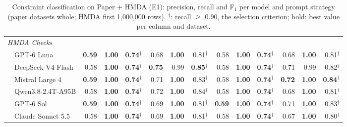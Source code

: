 \begin{table}[t]
\begin{tabular}{l@{\hspace{0.6em}}rrr@{\hspace{0.6em}}rrr@{\hspace{0.6em}}rrr@{\hspace{0.6em}}rrr}
  \midrule
  \multicolumn{13}{l}{\textit{HMDA Checks}} \\
  ~~GPT-6 Luna & \textbf{0.59} & \textbf{1.00} & \textbf{0.74}$^\dagger$ & 0.68 & \textbf{1.00} & 0.81$^\dagger$ & 0.58 & \textbf{1.00} & \textbf{0.74}$^\dagger$ & 0.68 & \textbf{1.00} & 0.81$^\dagger$ \\
  ~~DeepSeek-V4-Flash & 0.58 & \textbf{1.00} & \textbf{0.74}$^\dagger$ & \textbf{0.75} & 0.99 & \textbf{0.85}$^\dagger$ & 0.58 & \textbf{1.00} & \textbf{0.74}$^\dagger$ & 0.71 & 0.99 & 0.82$^\dagger$ \\
  ~~Mistral Large 4 & \textbf{0.59} & \textbf{1.00} & \textbf{0.74}$^\dagger$ & 0.71 & \textbf{1.00} & 0.83$^\dagger$ & 0.58 & \textbf{1.00} & \textbf{0.74}$^\dagger$ & \textbf{0.72} & \textbf{1.00} & \textbf{0.84}$^\dagger$ \\
  ~~Qwen3.8-2.4T-A95B & 0.58 & \textbf{1.00} & \textbf{0.74}$^\dagger$ & 0.72 & \textbf{1.00} & 0.84$^\dagger$ & 0.58 & \textbf{1.00} & \textbf{0.74}$^\dagger$ & 0.68 & \textbf{1.00} & 0.81$^\dagger$ \\
  ~~GPT-6 Sol & \textbf{0.59} & \textbf{1.00} & \textbf{0.74}$^\dagger$ & 0.69 & \textbf{1.00} & 0.81$^\dagger$ & \textbf{0.59} & \textbf{1.00} & \textbf{0.74}$^\dagger$ & 0.71 & \textbf{1.00} & 0.83$^\dagger$ \\
  ~~Claude Sonnet 5.5 & 0.58 & \textbf{1.00} & \textbf{0.74}$^\dagger$ & 0.69 & \textbf{1.00} & 0.81$^\dagger$ & 0.58 & \textbf{1.00} & \textbf{0.74}$^\dagger$ & 0.67 & \textbf{1.00} & 0.80$^\dagger$ \\
  \bottomrule
  \end{tabular}
  \caption{Constraint classification on Paper + HMDA (E1): precision, recall and F$_1$ per model and prompt strategy (paper datasets whole; HMDA first 1,000,000 rows). $^\dagger$: recall $\geq$ 0.90, the selection criterion; bold: best value per column and dataset.}
  \label{tab:paper_+_hmda_e1_classification}
\end{table}